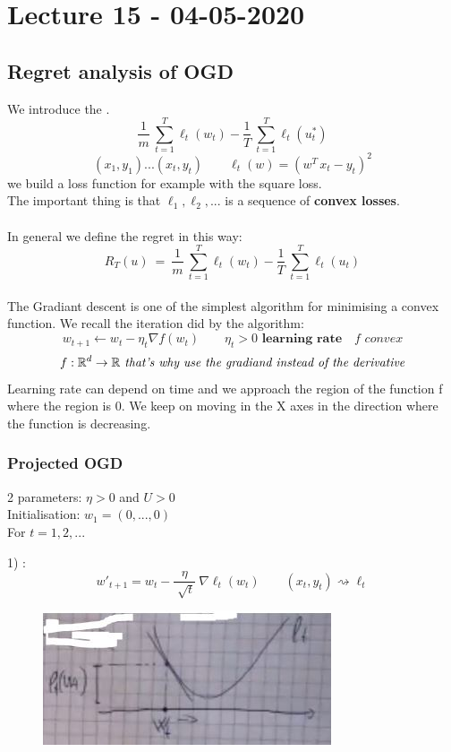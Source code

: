 \documentclass[../main.tex]{subfiles}
\begin{document}
\chapter{Lecture 15 - 04-05-2020}
 
 \section{Regret analysis of OGD}
 We introduce the .
 \\
 $$
 \frac{1}{m} \ \sum_{t=1}^{T} \ell_t(w_t) - \frac{1}{T} \ \sum_{t=1}^{T} \ell_t(u^*_t) 
 $$
$$
(x_1,y_1) ...(x_t,y_t) \qquad \ell_t(w) = \left( w^T \, x_t - y_t\right)^2
$$
we build a loss function for example with the square loss.
\\
The important thing is that $\ell_1 , \ell_2, ...$ is a sequence of \textbf{convex losses}.
\\\\
In general we define the regret in this way:
$$
 R_T(u) \ = \ \frac{1}{m} \ \sum_{t=1}^{T} \ell_t(w_t) - \frac{1}{T} \ \sum_{t=1}^{T} \ell_t(u_t) 
$$\\
The Gradiant descent is one of the simplest algorithm for minimising a convex function. We recall the iteration did by the algorithm:
$$
w_{t+1} \leftarrow w_t - \eta_t \nabla f(w_t) \qquad \eta_t > 0 \textbf{  learning rate} \quad \textit{f convex} 
$$
$$
f: \mathbb{R}^d \rightarrow \mathbb{R} \textit{ that's why use the gradiand instead of the derivative}
$$
Learning rate can depend on time and we approach the region of the function f where the region is 0. We keep on moving in the X axes in the direction where the function is decreasing.
\newpage
\subsection{Projected OGD}

2 parameters: $\eta > 0$ and $U > 0$
\\
Initialisation: $ w_1 = (0,...,0)$
\\
For $t = 1,2,...$

1) : 
$$w'_{t+1} = w_t - \frac{\eta}{\sqrt[]{t}} \ \nabla \ell_t(w_t) \qquad (x_t, y_t) \rightsquigarrow \ell_t
$$
\begin{figure}[h]
    \centering
    \includegraphics[width=0.3\linewidth]{../img/lez15-img1.JPG}
    \caption{}
\end{figure}\\
\end{document}
